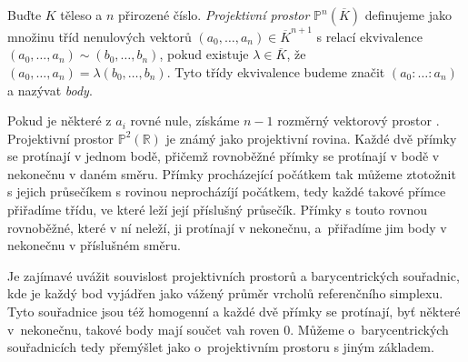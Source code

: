 \documentclass [12pt]{report}
\begin{document}
\begin{definice}
Buďte $K$ těleso a $n$ přirozené číslo. \textit{Projektivní prostor} $\mathbb{P}^n (\overline{K})$ definujeme jako množinu tříd nenulových vektorů $(a_0, \dots, a_n) \in \overline{K}^{n+1}$ s relací ekvivalence $(a_0, \dots, a_n) \sim (b_0, \dots, b_n)$, pokud existuje $\lambda \in \overline{K}$, že $(a_0, \dots, a_n) = \lambda (b_0, \dots, b_n)$. Tyto třídy ekvivalence budeme značit $(a_0 : \dots : a_n)$ a nazývat \textit{body}.\\
\end{definice}

Pokud je některé z $a_i$ rovné nule, získáme $n-1$ rozměrný vektorový prostor .\\


Projektivní prostor $\mathbb{P}^2 (\mathbb{R})$ je známý jako projektivní rovina. Každé dvě přímky se protínají v jednom bodě, přičemž rovnoběžné přímky se protínají v bodě v nekonečnu v daném směru. Přímky procházející počátkem tak můžeme ztotožnit s jejich průsečíkem s rovinou neprocházíjí počátkem, tedy každé takové přímce přiřadíme třídu, ve které leží její příslušný průsečík. Přímky s touto rovnou rovnoběžné, které v ní neleží, ji protínají v nekonečnu, a~přiřadíme jim body v nekonečnu v příslušném směru.
\begin{poznamka}
Je zajímavé uvážit souvislost projektivních prostorů a barycentrických souřadnic, kde je každý bod vyjádřen jako vážený průměr vrcholů referenčního simplexu. Tyto souřadnice jsou též homogenní a každé dvě přímky se protínají, byť některé v~nekonečnu, takové body mají součet vah roven $0$. Můžeme o~barycentrických souřadnicích tedy přemýšlet jako o~projektivním prostoru s jiným základem.
\end{poznamka}
\end{document}
